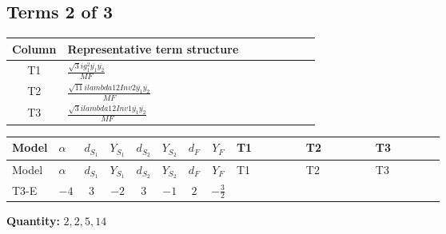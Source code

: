 \documentclass[8pt]{article}
\begin{document}
\begin{landscape}
\subsection*{Terms 2 of 3}
\begin{center}
\begin{tabular}{@{}c >{\raggedright\arraybackslash}p{0.82\linewidth}@{}}
\toprule
Column & Representative term structure \\
\midrule
T1 & \(\displaystyle \frac{\sqrt{3} i g_{1}^{2} \overline{y_{1}} \overline{y_{2}}}{MF}\) \\
\midrule
T2 & \(\displaystyle \frac{\sqrt{11} i lambda12Inv2 \overline{y_{1}} \overline{y_{2}}}{MF}\) \\
\midrule
T3 & \(\displaystyle \frac{\sqrt{3} i lambda12Inv1 \overline{y_{1}} \overline{y_{2}}}{MF}\) \\
\midrule
\bottomrule
\end{tabular}
\end{center}
\smallskip
\tiny
\begin{longtable}{@{}llcccccc >{\raggedright\arraybackslash}p{0.21\linewidth} >{\raggedright\arraybackslash}p{0.21\linewidth} >{\raggedright\arraybackslash}p{0.21\linewidth}@{}}
\toprule
Model & $\alpha$ & $d_{S_1}$ & $Y_{S_1}$ & $d_{S_2}$ & $Y_{S_2}$ & $d_F$ & $Y_F$ & T1 & T2 & T3 \\
\midrule
\endfirsthead
\toprule
Model & $\alpha$ & $d_{S_1}$ & $Y_{S_1}$ & $d_{S_2}$ & $Y_{S_2}$ & $d_F$ & $Y_F$ & T1 & T2 & T3 \\
\midrule
\endhead
T3-E & $-4$ & $3$ & $-2$ & $3$ & $-1$ & $2$ & $-\frac{3}{2}$ & \scriptsize\adjustbox{max width=\linewidth}{$\begin{gathered} - \frac{9 \sqrt{3} i g_{1}^{2} \overline{y_{1}} \overline{y_{2}}}{8 MF}\end{gathered}$} & \scriptsize\adjustbox{max width=\linewidth}{$\begin{gathered} - \frac{3 \sqrt{11} i lambda12Inv2 \overline{y_{1}} \overline{y_{2}}}{22 MF}\end{gathered}$} & \scriptsize\adjustbox{max width=\linewidth}{$\begin{gathered} \frac{\sqrt{3} i lambda12Inv1 \overline{y_{1}} \overline{y_{2}}}{6 MF}\end{gathered}$} \\
\midrule
\bottomrule
\end{longtable}
\clearpage
\noindent\textbf{Quantity: }$\mathrm{2,2,5,14}$\par\smallskip

\end{landscape}
\end{document}
